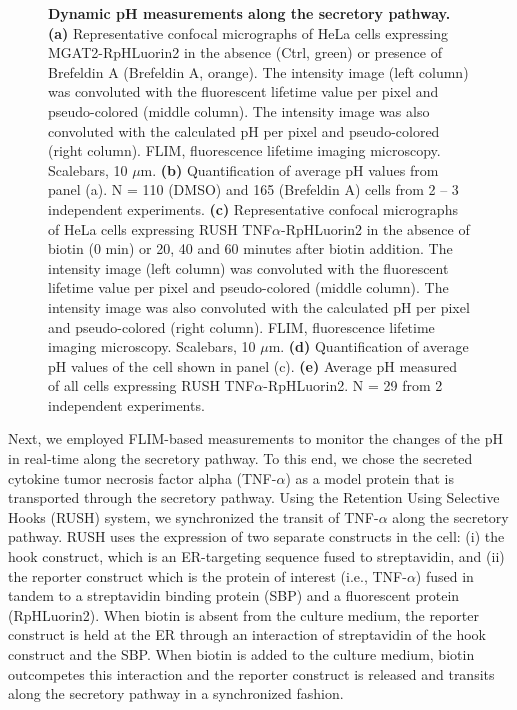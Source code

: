 \begin{figure}
    \caption{\textbf{Dynamic pH measurements along the secretory pathway.} \textbf{(a)} Representative confocal micrographs of HeLa cells expressing MGAT2-RpHLuorin2 in the absence (Ctrl, green) or presence of Brefeldin A (Brefeldin A, orange).  The intensity image (left column) was convoluted with the fluorescent lifetime value per pixel and pseudo-colored (middle column). The intensity image was also convoluted with the calculated pH per pixel and pseudo-colored (right column). FLIM, fluorescence lifetime imaging microscopy. Scalebars, 10 $\mu$m. \textbf{(b)} Quantification of average pH values from panel (a). N = 110 (DMSO) and 165 (Brefeldin A) cells from 2 – 3 independent experiments. \textbf{(c)} Representative confocal micrographs of HeLa cells expressing RUSH TNF$\alpha$-RpHLuorin2 in the absence of biotin (0 min) or 20, 40 and 60 minutes after biotin addition. The intensity image (left column) was convoluted with the fluorescent lifetime value per pixel and pseudo-colored (middle column). The intensity image was also convoluted with the calculated pH per pixel and pseudo-colored (right column). FLIM, fluorescence lifetime imaging microscopy. Scalebars, 10 $\mu$m. \textbf{(d)} Quantification of average pH values of the cell shown in panel (c). \textbf{(e)} Average pH measured of all cells expressing RUSH TNF$\alpha$-RpHLuorin2. N = 29 from 2 independent experiments.}
    \label{fig:ch3fig4}
\end{figure}


Next, we employed FLIM-based measurements to monitor the changes of the pH in real-time along the secretory pathway. To this end, we chose the secreted cytokine tumor necrosis factor alpha (TNF-$\alpha$) as a model protein that is transported through the secretory pathway. Using the Retention Using Selective Hooks (RUSH) system\cite{boncompain_synchronization_2012}, we synchronized the transit of TNF-$\alpha$ along the secretory pathway. RUSH uses the expression of two separate constructs in the cell: (i) the hook construct, which is an ER-targeting sequence fused to streptavidin, and (ii) the reporter construct which is the protein of interest (i.e., TNF-$\alpha$) fused in tandem to a streptavidin binding protein (SBP) and a fluorescent protein (RpHLuorin2). When biotin is absent from the culture medium, the reporter construct is held at the ER through an interaction of streptavidin of the hook construct and the SBP. When biotin is added to the culture medium, biotin outcompetes this interaction and the reporter construct is released and transits along the secretory pathway in a synchronized fashion.

